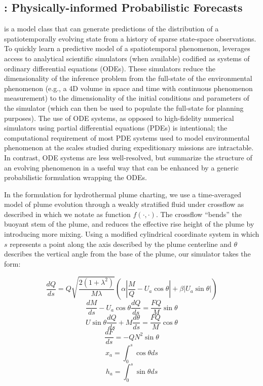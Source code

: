 \subsection{\PHUMES: Physically-informed Probabilistic Forecasts}
\label{sec:phumes}
\PHUMES is a model class that can generate predictions of the distribution of a spatiotemporally evolving state from a history of sparse state-space observations. To quickly learn a predictive model of a spatiotemporal phenomenon, \PHUMES leverages access to analytical scientific simulators (when available) codified as systems of ordinary differential equations (ODEs). These simulators reduce the dimensionality of the inference problem from the full-state of the environmental phenomenon (e.g., a 4D volume in space and time with continuous phenomenon measurement) to the dimensionality of the initial conditions and parameters of the simulator (which can then be used to populate the full-state for planning purposes). The use of ODE systems, as opposed to high-fidelity numerical simulators using partial differential equations (PDEs) is intentional; the computational requirement of most PDE systems used to model environmental phenomenon at the scales studied during expeditionary missions are intractable. In contrast, ODE systems are less well-resolved, but summarize the structure of an evolving phenomenon in a useful way that can be enhanced by a generic probabilistic formulation wrapping the ODEs.

In the \PHUMES formulation for hydrothermal plume charting, we use a time-averaged model of plume evolution through a weakly stratified fluid under crossflow as described in \cite{tohidi2016highly} which we notate as function $f(\cdot, \cdot)$. The crossflow ``bends'' the buoyant stem of the plume, and reduces the effective rise height of the plume by introducing more mixing. Using a modified cylindrical coordinate system in which $s$ represents a point along the axis described by the plume centerline and $\theta$ describes the vertical angle from the base of the plume, our \PHUMES simulator takes the form:

\begin{equation}
    \frac{dQ}{ds} = Q\sqrt{\frac{2(1+\lambda^2)}{M\lambda}}(\alpha|\frac{M}{Q} - U_a\cos\theta| + \beta|U_a\sin\theta|)
\end{equation}
\begin{equation}
    \frac{dM}{ds} - U_a\cos\theta\frac{dQ}{ds} = \frac{FQ}{M}\sin\theta 
\end{equation}
\begin{equation}
    U\sin\theta\frac{dQ}{ds} + M\frac{d\theta}{ds} = \frac{FQ}{M}\cos\theta
\end{equation}
\begin{equation}
    \frac{dF}{ds} = -QN^2\sin\theta
\end{equation}
\begin{equation}
    x_a = \int_0^s\cos\theta ds
\end{equation}
\begin{equation}
    h_a = \int_0^s \sin\theta ds
\end{equation}

